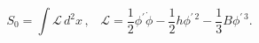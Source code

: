 \begin{equation}
S_{0}=\int \mathcal{L\,}d^{2}x\,,\;\;\;\mathcal{L}=\frac{1}{2}\phi ^{\prime }%
\dot{\phi}-\frac{1}{2}h\phi ^{\prime \,2}-\frac{1}{3}B\phi ^{\prime \,3}.
\label{w3act}
\end{equation}

